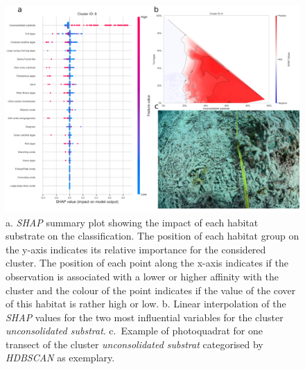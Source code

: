 \begin{figure}
\hypertarget{fig:chap2figS28}{%
\centering
\includegraphics{03-Chapitre2/figures/supplementary/05-explanation_shap_pq_cluster_8.png}
\caption{a. \emph{SHAP} summary plot showing the impact of each habitat
substrate on the classification. The position of each habitat group on
the y-axis indicates its relative importance for the considered cluster.
The position of each point along the x-axis indicates if the observation
is associated with a lower or higher affinity with the cluster and the
colour of the point indicates if the value of the cover of this habitat
is rather high or low. b. Linear interpolation of the \emph{SHAP} values
for the two most influential variables for the cluster
\emph{unconsolidated substrat}. c.~Example of photoquadrat for one
transect of the cluster \emph{unconsolidated substrat} categorised by
\emph{HDBSCAN} as exemplary.}\label{fig:chap2figS28}
}
\end{figure}

